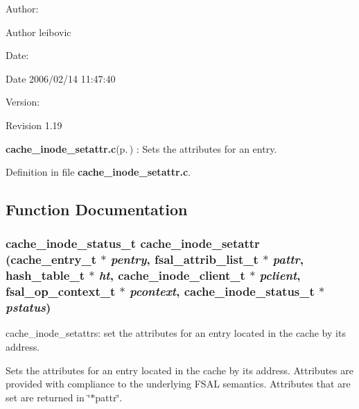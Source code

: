 \begin{Desc}
\item[Author:]\begin{Desc}
\item[Author]leibovic \end{Desc}
\end{Desc}
\begin{Desc}
\item[Date:]\begin{Desc}
\item[Date]2006/02/14 11:47:40 \end{Desc}
\end{Desc}
\begin{Desc}
\item[Version:]\begin{Desc}
\item[Revision]1.19 \end{Desc}
\end{Desc}
{\bf cache\_\-inode\_\-setattr.c}{\rm (p.\,\pageref{cache__inode__setattr_8c})} : Sets the attributes for an entry.

Definition in file {\bf cache\_\-inode\_\-setattr.c}.

\subsection{Function Documentation}
\subsubsection{\setlength{\rightskip}{0pt plus 5cm}cache\_\-inode\_\-status\_\-t cache\_\-inode\_\-setattr (cache\_\-entry\_\-t $\ast$ {\em pentry}, fsal\_\-attrib\_\-list\_\-t $\ast$ {\em pattr}, hash\_\-table\_\-t $\ast$ {\em ht}, cache\_\-inode\_\-client\_\-t $\ast$ {\em pclient}, fsal\_\-op\_\-context\_\-t $\ast$ {\em pcontext}, cache\_\-inode\_\-status\_\-t $\ast$ {\em pstatus})}\label{cache__inode__setattr_8c_a0}


cache\_\-inode\_\-setattrs: set the attributes for an entry located in the cache by its address.

Sets the attributes for an entry located in the cache by its address. Attributes are provided with compliance to the underlying FSAL semantics. Attributes that are set are returned in \char`\"{}$\ast$pattr\char`\"{}.

